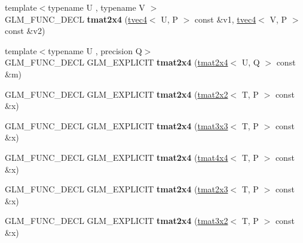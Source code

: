 \begin{DoxyCompactItemize}
\item 
\mbox{\label{structglm_1_1tmat2x4_ab52cdbf9a2f1ae4b9b8d3e6ef8e84039}} 
{\footnotesize template$<$typename U , typename V $>$ }\\G\+L\+M\+\_\+\+F\+U\+N\+C\+\_\+\+D\+E\+CL {\bfseries tmat2x4} (\hyperlink{structglm_1_1tvec4}{tvec4}$<$ U, P $>$ const \&v1, \hyperlink{structglm_1_1tvec4}{tvec4}$<$ V, P $>$ const \&v2)
\item 
\mbox{\label{structglm_1_1tmat2x4_a927ed33ecafc04dffbdc44b25e4b5466}} 
{\footnotesize template$<$typename U , precision Q$>$ }\\G\+L\+M\+\_\+\+F\+U\+N\+C\+\_\+\+D\+E\+CL G\+L\+M\+\_\+\+E\+X\+P\+L\+I\+C\+IT {\bfseries tmat2x4} (\hyperlink{structglm_1_1tmat2x4}{tmat2x4}$<$ U, Q $>$ const \&m)
\item 
\mbox{\label{structglm_1_1tmat2x4_afc1dac325dc83720bcd251de94f5fdfc}} 
G\+L\+M\+\_\+\+F\+U\+N\+C\+\_\+\+D\+E\+CL G\+L\+M\+\_\+\+E\+X\+P\+L\+I\+C\+IT {\bfseries tmat2x4} (\hyperlink{structglm_1_1tmat2x2}{tmat2x2}$<$ T, P $>$ const \&x)
\item 
\mbox{\label{structglm_1_1tmat2x4_a315e700449248bbe7938b858a94e98ce}} 
G\+L\+M\+\_\+\+F\+U\+N\+C\+\_\+\+D\+E\+CL G\+L\+M\+\_\+\+E\+X\+P\+L\+I\+C\+IT {\bfseries tmat2x4} (\hyperlink{structglm_1_1tmat3x3}{tmat3x3}$<$ T, P $>$ const \&x)
\item 
\mbox{\label{structglm_1_1tmat2x4_ada474dee56734cd6ad136b0845e1f71e}} 
G\+L\+M\+\_\+\+F\+U\+N\+C\+\_\+\+D\+E\+CL G\+L\+M\+\_\+\+E\+X\+P\+L\+I\+C\+IT {\bfseries tmat2x4} (\hyperlink{structglm_1_1tmat4x4}{tmat4x4}$<$ T, P $>$ const \&x)
\item 
\mbox{\label{structglm_1_1tmat2x4_ad992a0195fb70e4ec2345b8ce248a9a6}} 
G\+L\+M\+\_\+\+F\+U\+N\+C\+\_\+\+D\+E\+CL G\+L\+M\+\_\+\+E\+X\+P\+L\+I\+C\+IT {\bfseries tmat2x4} (\hyperlink{structglm_1_1tmat2x3}{tmat2x3}$<$ T, P $>$ const \&x)
\item 
\mbox{\label{structglm_1_1tmat2x4_a52740ff1048b8283e22c07c743aaf8f9}} 
G\+L\+M\+\_\+\+F\+U\+N\+C\+\_\+\+D\+E\+CL G\+L\+M\+\_\+\+E\+X\+P\+L\+I\+C\+IT {\bfseries tmat2x4} (\hyperlink{structglm_1_1tmat3x2}{tmat3x2}$<$ T, P $>$ const \&x)

\end{DoxyCompactItemize}
